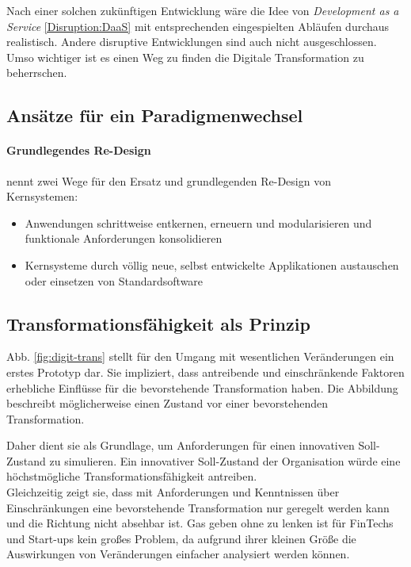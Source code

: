 Nach einer solchen zukünftigen Entwicklung wäre die Idee von \emph{Development as a Service} \ref{Disruption:DaaS} mit entsprechenden eingespielten Abläufen durchaus realistisch. Andere disruptive Entwicklungen sind auch nicht ausgeschlossen. Umso wichtiger ist es einen Weg zu finden die Digitale Transformation zu beherrschen.

%
%
%
%
\subsection{Ansätze für ein Paradigmenwechsel}

\paragraph{Grundlegendes Re-Design}
\label{ansatz:modularisieren}
\citet{Bussmann2006} nennt zwei Wege für den Ersatz und grundlegenden Re-Design von Kernsystemen:
\begin{itemize}
    \item Anwendungen schrittweise entkernen, erneuern und modularisieren und funktionale Anforderungen konsolidieren
    \item Kernsysteme durch völlig neue, selbst entwickelte Applikationen austauschen oder einsetzen von Standardsoftware
\end{itemize}


\subsection{Transformationsfähigkeit als Prinzip}
 
Abb. \ref{fig:digit-trans} stellt für den Umgang mit wesentlichen Veränderungen ein erstes Prototyp dar. Sie impliziert, dass antreibende und einschränkende Faktoren erhebliche Einflüsse für die bevorstehende Transformation haben. Die Abbildung beschreibt möglicherweise einen Zustand vor einer bevorstehenden Transformation.

Daher dient sie als Grundlage, um Anforderungen für einen innovativen Soll-Zustand zu simulieren. Ein innovativer Soll-Zustand der Organisation würde eine höchstmögliche Transformationsfähigkeit antreiben. 
\medskip
\\
Gleichzeitig zeigt sie, dass mit Anforderungen und Kenntnissen über Einschränkungen eine bevorstehende Transformation nur geregelt werden kann und die Richtung nicht absehbar ist. Gas geben ohne zu lenken ist für FinTechs und Start-ups kein großes Problem, da aufgrund ihrer kleinen Größe die Auswirkungen von Veränderungen einfacher analysiert werden können.

